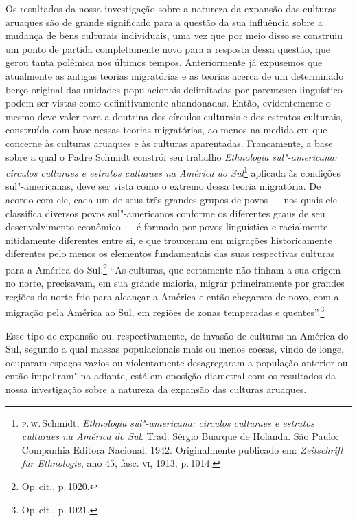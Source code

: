 Os resultados da nossa investigação sobre a natureza da expansão das
culturas aruaques são de grande significado para a questão da sua
influência sobre a mudança de bens culturais individuais, uma vez que
por meio disso se construiu um ponto de partida completamente novo para
a resposta dessa questão, que gerou tanta polêmica nos últimos tempos.
Anteriormente já expusemos que atualmente as antigas teorias migratórias
e as teorias acerca de um determinado berço original das unidades
populacionais delimitadas por parentesco linguístico podem ser vistas
como definitivamente abandonadas. Então, evidentemente o mesmo deve
valer para a doutrina dos círculos culturais e dos estratos culturais,
construída com base nessas teorias migratórias, ao menos na medida em
que concerne às culturas aruaques e às culturas aparentadas. Francamente,
a base sobre a qual o Padre Schmidt constrói seu trabalho \textit{Ethnologia sul"-americana: circulos
  culturaes e estratos culturaes na América do Sul}\footnote{\textsc{p}.\,\textsc{w}.\,Schmidt,
  \textit{Ethnologia sul"-americana: circulos
  culturaes e estratos culturaes na América do Sul}. Trad. Sérgio Buarque de Holanda. São Paulo: Companhia Editora Nacional, 1942. Originalmente publicado em:
  \textit{Zeitschrift für Ethnologie}, ano 45, fasc. \textsc{vi}, 1913, p.\,1014.} aplicada às condições sul"-americanas, deve ser vista como
o extremo dessa teoria migratória. De acordo com ele, cada um de seus
três grandes grupos de povos --- nos quais ele classifica diversos povos
sul"-americanos conforme os diferentes graus de seu desenvolvimento
econômico --- é formado por povos linguística e racialmente nitidamente
diferentes entre si, e que trouxeram em migrações historicamente
diferentes pelo menos os elementos fundamentais das suas respectivas
culturas para a América do Sul.\footnote{Op.\,cit., p.\,1020.} ``As
culturas, que certamente não tinham a sua origem no norte, precisavam,
em sua grande maioria, migrar primeiramente por grandes regiões do
norte frio para alcançar a América e então chegaram de novo, com a
migração pela América ao Sul, em regiões de zonas temperadas e
quentes''.\footnote{Op.\,cit., p.\,1021.}

Esse tipo de expansão ou, respectivamente, de invasão de culturas na
América do Sul, segundo a qual massas populacionais mais ou menos
coesas, vindo de longe, ocuparam espaços vazios ou violentamente
desagregaram a população anterior ou então impeliram"-na adiante, está em
oposição diametral com os resultados da nossa investigação sobre a
natureza da expansão das culturas aruaques.

